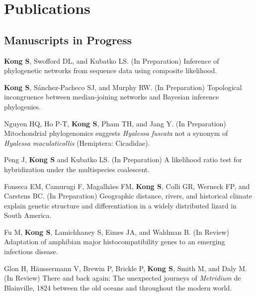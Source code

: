 \documentclass[11pt]{article}
\begin{document}
\hspace{0pt}


\section*{Publications}
\subsection*{Manuscripts in Progress}
\begin{etaremune}




	\item \textbf{Kong S}, Swofford DL, and Kubatko LS. (In Preparation) Inference of phylogenetic networks from sequence data using composite likelihood. %

	\item \textbf{Kong S}, Sánchez-Pacheco SJ, and Murphy RW. (In Preparation) Topological incongruence between median-joining networks and Bayesian inference phylogenies. %

	\item Nguyen HQ, Ho P-T, \textbf{Kong S}, Pham TH, and Jang Y. (In Preparation) Mitochondrial phylogenomics suggests \textit{Hyalessa fuscata} not a synonym of \textit{Hyalessa maculaticollis} (Hemiptera: Cicadidae).
	
	\item Peng J, \textbf{Kong S} and Kubatko LS. (In Preparation) A likelihood ratio test for hybridization under the multispecies coalescent. %
		
	\item Fonseca EM, Camurugi F, Magalhães FM, \textbf{Kong S}, Colli GR, Werneck FP, and Carstens BC. (In Preparation) Geographic distance, rivers, and historical climate explain genetic structure and differentiation in a widely distributed lizard in South America. %

	\item Fu M, \textbf{Kong S}, Lamichhaney S, Eimes JA, and Waldman B. (In Review) Adaptation of amphibian major histocompatibility genes to an emerging infectious disease. %
	
	\item Glon H, Häussermann V, Brewin P, Brickle P, \textbf{Kong S}, Smith M, and Daly M. (In Review) There and back again: The unexpected journeys of \textit{Metridium} de Blainville, 1824 between the old oceans and throughout the modern world. %
		

	
\end{etaremune}
\end{document}
